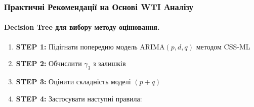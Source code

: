 \subsubsection{Практичні Рекомендації на Основі WTI Аналізу}
\label{subsubsec:wti_practical_recommendations}

\paragraph{Decision Tree для вибору методу оцінювання.}

\begin{enumerate}
    \item \textbf{STEP 1:} Підігнати попередню модель ARIMA$(p,d,q)$ методом CSS-ML
    \item \textbf{STEP 2:} Обчислити $\gamma_3$ з залишків
    \item \textbf{STEP 3:} Оцінити складність моделі $(p+q)$
    \item \textbf{STEP 4:} Застосувати наступні правила:
\end{enumerate}

